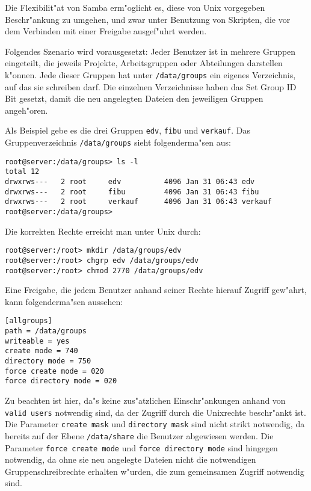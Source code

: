 \documentclass{scrartcl}
\newcommand{\param}{\texttt}
\newcommand{\datei}{\texttt}
\begin{document}
Die Flexibilit"at von Samba erm"oglicht es, diese von Unix
vorgegeben Beschr"ankung zu umgehen, und zwar unter Benutzung von
Skripten, die vor dem Verbinden mit einer Freigabe ausgef"uhrt werden.

Folgendes Szenario wird vorausgesetzt: Jeder Benutzer ist in mehrere
Gruppen eingeteilt, die jeweils Projekte, Arbeitsgruppen oder
Abteilungen darstellen k"onnen. Jede dieser Gruppen hat unter
\datei{/data/groups} ein eigenes Verzeichnis, auf das sie schreiben
darf. Die einzelnen Verzeichnisse haben das Set Group ID Bit gesetzt,
damit die neu angelegten Dateien den jeweiligen Gruppen angeh"oren.

Als Beispiel gebe es die drei Gruppen \param{edv}, \param{fibu} und
\param{verkauf}. Das Gruppenverzeichnis \datei{/data/groups} sieht
folgenderma"sen aus:

{\small\begin{verbatim}
root@server:/data/groups> ls -l
total 12
drwxrws---   2 root     edv          4096 Jan 31 06:43 edv
drwxrws---   2 root     fibu         4096 Jan 31 06:43 fibu
drwxrws---   2 root     verkauf      4096 Jan 31 06:43 verkauf
root@server:/data/groups>
\end{verbatim}
}

Die korrekten Rechte erreicht man unter Unix durch:

{\small\begin{verbatim}
root@server:/root> mkdir /data/groups/edv
root@server:/root> chgrp edv /data/groups/edv
root@server:/root> chmod 2770 /data/groups/edv
\end{verbatim}
}

Eine Freigabe, die jedem Benutzer anhand seiner Rechte hierauf Zugriff
gew"ahrt, kann folgenderma"sen aussehen:

{\small\begin{verbatim}
[allgroups]
path = /data/groups
writeable = yes
create mode = 740
directory mode = 750
force create mode = 020
force directory mode = 020
\end{verbatim}
}

Zu beachten ist hier, da"s keine zus"atzlichen Einschr"ankungen anhand
von \param{valid users} notwendig sind, da der Zugriff durch die
Unixrechte beschr"ankt ist. Die Parameter \param{create mask} und
\param{directory mask} sind nicht strikt notwendig, da bereits auf der
Ebene \datei{/data/share} die Benutzer abgewiesen werden. Die
Parameter \datei{force create mode} und \param{force directory mode}
sind hingegen notwendig, da ohne sie neu angelegte Dateien nicht die
notwendigen Gruppenschreibrechte erhalten w"urden, die zum gemeinsamen
Zugriff notwendig sind.
\end{document}
